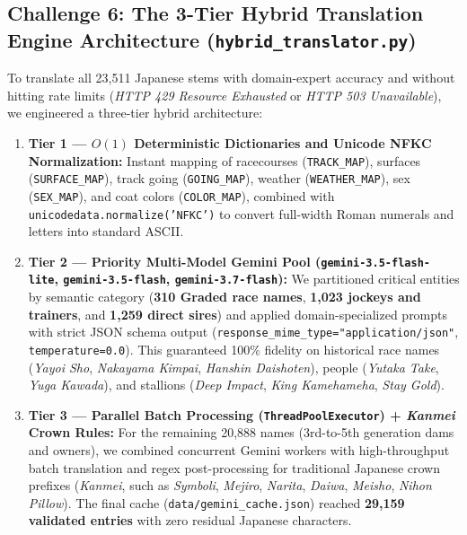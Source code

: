 \documentclass[12pt,a4paper]{article}
\begin{document}
\subsection{Challenge 6: The 3-Tier Hybrid Translation Engine Architecture (\texttt{hybrid\_translator.py})}
To translate all 23,511 Japanese stems with domain-expert accuracy and without hitting rate limits (\textit{HTTP 429 Resource Exhausted} or \textit{HTTP 503 Unavailable}), we engineered a three-tier hybrid architecture:
\begin{enumerate}
    \item \textbf{Tier 1 --- $O(1)$ Deterministic Dictionaries and Unicode NFKC Normalization:} Instant mapping of racecourses (\texttt{TRACK\_MAP}), surfaces (\texttt{SURFACE\_MAP}), track going (\texttt{GOING\_MAP}), weather (\texttt{WEATHER\_MAP}), sex (\texttt{SEX\_MAP}), and coat colors (\texttt{COLOR\_MAP}), combined with \texttt{unicodedata.normalize('NFKC')} to convert full-width Roman numerals and letters into standard ASCII.
    \item \textbf{Tier 2 --- Priority Multi-Model Gemini Pool (\texttt{gemini-3.5-flash-lite}, \texttt{gemini-3.5-flash}, \texttt{gemini-3.7-flash}):} We partitioned critical entities by semantic category (\textbf{310 Graded race names}, \textbf{1,023 jockeys and trainers}, and \textbf{1,259 direct sires}) and applied domain-specialized prompts with strict JSON schema output (\texttt{response\_mime\_type="application/json"}, \texttt{temperature=0.0}). This guaranteed 100\% fidelity on historical race names (\textit{Yayoi Sho}, \textit{Nakayama Kimpai}, \textit{Hanshin Daishoten}), people (\textit{Yutaka Take}, \textit{Yuga Kawada}), and stallions (\textit{Deep Impact}, \textit{King Kamehameha}, \textit{Stay Gold}).
    \item \textbf{Tier 3 --- Parallel Batch Processing (\texttt{ThreadPoolExecutor}) + \textit{Kanmei} Crown Rules:} For the remaining 20,888 names (3rd-to-5th generation dams and owners), we combined concurrent Gemini workers with high-throughput batch translation and regex post-processing for traditional Japanese crown prefixes (\textit{Kanmei}, such as \textit{Symboli}, \textit{Mejiro}, \textit{Narita}, \textit{Daiwa}, \textit{Meisho}, \textit{Nihon Pillow}). The final cache (\texttt{data/gemini\_cache.json}) reached \textbf{29,159 validated entries} with zero residual Japanese characters.
\end{enumerate}
\end{document}
